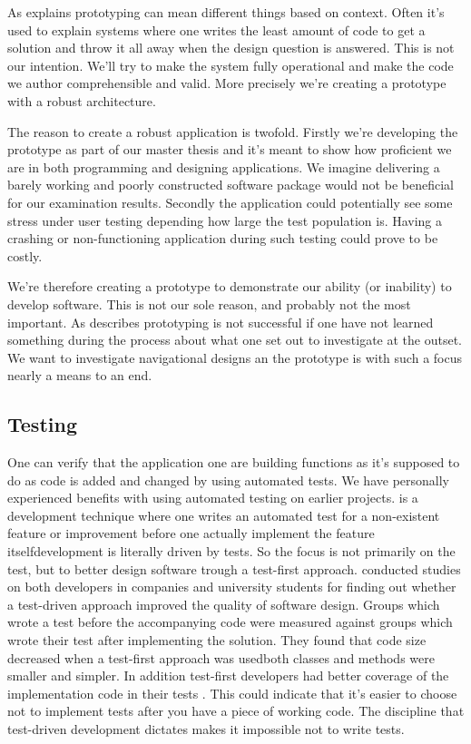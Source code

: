 As \citet[]{mcconnell04} explains prototyping can mean different things
based on context. Often it's used to explain systems where one writes the
least amount of code to get a solution and throw it all away when the design
question is answered. This is not our intention. We'll try to make the system
fully operational and make the code we author comprehensible and
valid. More precisely we're creating a  prototype
\cite[]{rudd96} with a robust architecture.

The reason to create a robust application is twofold. Firstly we're developing
the prototype as part of our master thesis and it's meant to show how
proficient we are in both programming and designing applications. We
imagine delivering a barely working and poorly constructed software package
would not be beneficial for our examination results.
Secondly the application could potentially see some stress under user testing
depending how large the test population is. Having a crashing or
non-functioning application during such testing could prove to be costly.

We're therefore creating a prototype to demonstrate our ability (or inability)
to develop software. This is not our sole reason, and probably not the most
important. As \citet[]{mayhew90} describes prototyping is not
successful if one have not learned something during the process about what one
set out to investigate at the outset. We want to investigate navigational
designs an the prototype is with such a focus nearly a means to an end.

\subsection{Testing}
\label{section:implementation.process.testing}

One can verify that the application one are building functions as it's
supposed to do as code is added and changed by using automated tests.
We have personally experienced benefits with using automated testing on
earlier projects.
 is a development technique
where one writes an automated test for a non-existent feature or
improvement before one actually implement the feature itself\dash{}development
is literally driven by tests. So the focus is not primarily on the test, but
to better design software trough a test-first approach.
\citet{janzen08} conducted studies
on both developers in companies and university students for finding out
whether a test-driven approach improved the quality of software design.
Groups which wrote a test before the accompanying code were measured
against groups which wrote their test after implementing the solution.
They found that code size decreased when a test-first approach was
used\dash{}both classes and methods were smaller and simpler. In addition
test-first developers had better coverage of the implementation code in
their tests \citep[]{janzen08}. This could indicate that it's
easier to choose not to implement tests after you have a piece
of working code. The discipline that test-driven development dictates
makes it impossible not to write tests.


